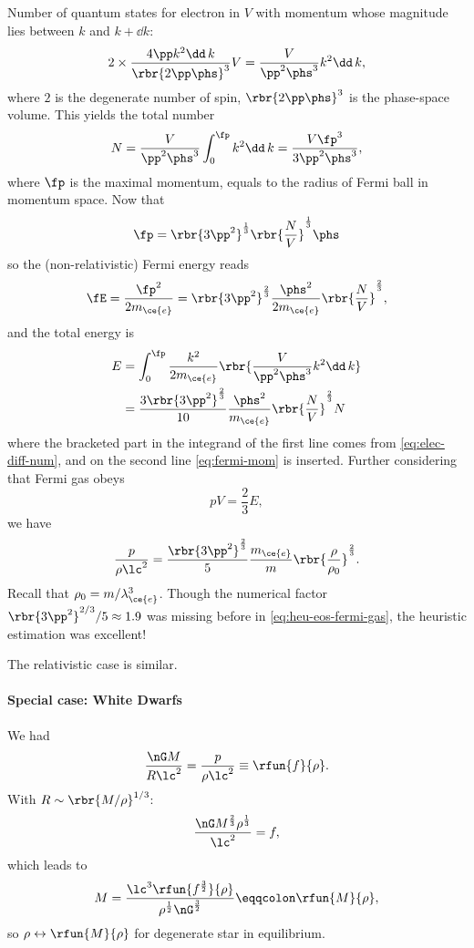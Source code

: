 Number of quantum states for electron in $V$ with momentum whose magnitude
lies between $k$ and $k+\dd k$:
\begin{equation}
2\times\frac{4\pp k^2\dd\, k}{\rbr{2\pp\phs}^3}V
= \frac{V}{\pp^2 \phs^3} k^2\dd\, k,
\label{eq:elec-diff-num}
\end{equation}
where $2$ is the degenerate number of spin, $\rbr{2\pp\phs}^3$ is the
phase-space volume. This yields the total number
\begin{equation}
N = \frac{V}{\pp^2\phs^3}\int_0^{\fp} k^2 \dd\, k
= \frac{V\fp^3}{3\pp^2\phs^3},
\end{equation}
where $\fp$ is the maximal momentum, equals to the radius of Fermi ball in
momentum space. Now that
\begin{equation}
\fp = \rbr{3\pp^2}^\frac{1}{3}\rbr{\frac{N}{V}}^\frac{1}{3}\phs
\label{eq:fermi-mom}
\end{equation}
so the (non-relativistic) Fermi energy reads
\begin{equation}
\fE = 
\frac{\fp^2}{2m_{\ce{e}}}=\rbr{3\pp^2}^\frac{2}{3}\frac{\phs^2}{2m_{\ce{e}}}
\rbr{\frac{N}{V}}^\frac{2}{3},
\end{equation}
and the total energy is
\begin{align}
E &= \int_0^{\fp}\frac{k^2}{2m_{\ce{e}}}\rbr{\frac{V}{\pp^2\phs^3}k^2\dd\, k}
\nonumber \\
&= \frac{3\rbr{3\pp^2}^\frac{2}{3}}{10}\frac{\phs^2}{m_{\ce{e}}}
\rbr{\frac{N}{V}}^\frac{2}{3}N
\end{align}
where the bracketed part in the integrand of the first line comes from
\cref{eq:elec-diff-num}, and on the second line \cref{eq:fermi-mom} is
inserted. Further considering that Fermi gas obeys
\begin{equation}
pV = \frac{2}{3}E,
\end{equation}
we have
\begin{equation}
\frac{p}{\rho\lc^2}=\frac{\rbr{3\pp^2}^\frac{2}{3}}{5}\frac{m_{\ce{e}}}{m}
\rbr{\frac{\rho}{\rho_0}}^\frac{2}{3}.
\end{equation}
Recall that $\rho_0 = m/\lambda_{\ce{e}}^3$. Though the numerical factor 
$\rbr{3\pp^2}^{2/3}/5 \approx 1.9$ was missing before in
\cref{eq:heu-eos-fermi-gas}, the heuristic estimation was excellent!

The relativistic case is similar.

\paragraph{Special case: White Dwarfs} We had
\begin{equation}
\frac{\nG M}{R\lc^2} = \frac{p}{\rho \lc^2} \equiv \rfun{f}{\rho}.
\end{equation}
With $R\sim\rbr{M/\rho}^{1/3}$:
\begin{equation}
\frac{\nG M^\frac{2}{3} \rho^\frac{1}{3}}{\lc^2} = f,
\end{equation}
which leads to
\begin{equation}
M = \frac{\lc^3 \rfun{f^\frac{3}{2}}{\rho}}{\rho^\frac{1}{2}\nG^\frac{3}{2}}
\eqqcolon\rfun{M}{\rho},
\end{equation}
so $\rho\leftrightarrow\rfun{M}{\rho}$ for degenerate star in equilibrium.


